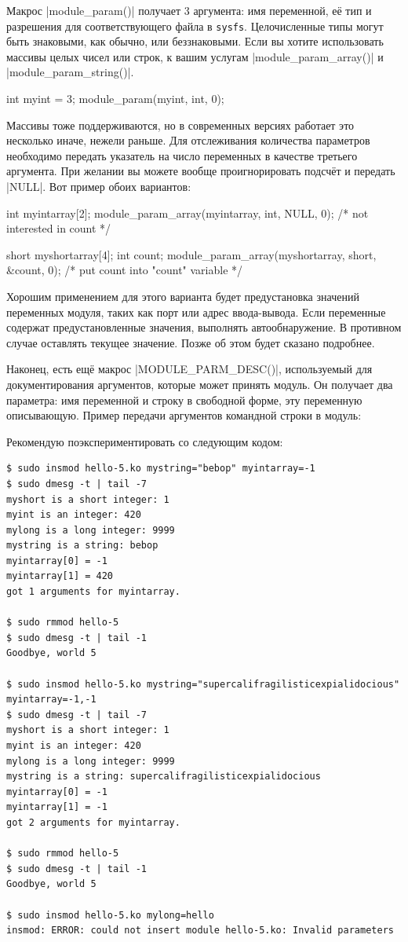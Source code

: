 \documentclass[10pt, oneside]{book}
\begin{document}
Макрос \cpp|module_param()| получает 3 аргумента: имя переменной, её тип и разрешения для соответствующего файла в \verb|sysfs|. Целочисленные типы могут быть знаковыми, как обычно, или беззнаковыми. Если вы хотите использовать массивы целых чисел или строк, к вашим услугам \cpp|module_param_array()| и \cpp|module_param_string()|.

\begin{code}
int myint = 3;
module_param(myint, int, 0);
\end{code}

Массивы тоже поддерживаются, но в современных версиях работает это несколько иначе, нежели раньше. Для отслеживания количества параметров необходимо передать указатель на число переменных в качестве третьего аргумента. При желании вы можете вообще проигнорировать подсчёт и передать \cpp|NULL|. Вот пример обоих вариантов:

\begin{code}
int myintarray[2];
module_param_array(myintarray, int, NULL, 0); /* not interested in count */

short myshortarray[4];
int count;
module_param_array(myshortarray, short, &count, 0); /* put count into "count" variable */
\end{code}

Хорошим применением для этого варианта будет предустановка значений переменных модуля, таких как порт или адрес ввода-вывода. Если переменные содержат
предустановленные значения, выполнять автообнаружение. В противном случае оставлять текущее значение. Позже об этом будет сказано подробнее.

Наконец, есть ещё макрос \cpp|MODULE_PARM_DESC()|, используемый для документирования аргументов, которые может принять модуль. Он получает два параметра: имя переменной и строку в свободной форме, эту переменную описывающую.
Пример передачи аргументов командной строки в модуль:


Рекомендую поэкспериментировать со следующим кодом:
\begin{verbatim}
$ sudo insmod hello-5.ko mystring="bebop" myintarray=-1
$ sudo dmesg -t | tail -7
myshort is a short integer: 1
myint is an integer: 420
mylong is a long integer: 9999
mystring is a string: bebop
myintarray[0] = -1
myintarray[1] = 420
got 1 arguments for myintarray.

$ sudo rmmod hello-5
$ sudo dmesg -t | tail -1
Goodbye, world 5

$ sudo insmod hello-5.ko mystring="supercalifragilisticexpialidocious" myintarray=-1,-1
$ sudo dmesg -t | tail -7
myshort is a short integer: 1
myint is an integer: 420
mylong is a long integer: 9999
mystring is a string: supercalifragilisticexpialidocious
myintarray[0] = -1
myintarray[1] = -1
got 2 arguments for myintarray.

$ sudo rmmod hello-5
$ sudo dmesg -t | tail -1
Goodbye, world 5

$ sudo insmod hello-5.ko mylong=hello
insmod: ERROR: could not insert module hello-5.ko: Invalid parameters
\end{verbatim}
\end{document}
